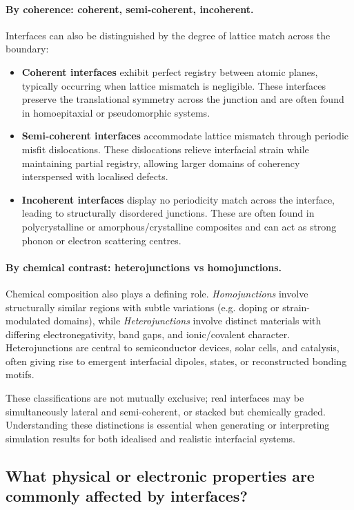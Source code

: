 \paragraph{By coherence: coherent, semi-coherent, incoherent.} Interfaces can also be distinguished by the degree of lattice match across the boundary:

\begin{itemize}
    \item \textbf{Coherent interfaces} exhibit perfect registry between atomic planes, typically occurring when lattice mismatch is negligible. These interfaces preserve the translational symmetry across the junction and are often found in homoepitaxial or pseudomorphic systems.
    \item \textbf{Semi-coherent interfaces} accommodate lattice mismatch through periodic misfit dislocations. These dislocations relieve interfacial strain while maintaining partial registry, allowing larger domains of coherency interspersed with localised defects.
    \item \textbf{Incoherent interfaces} display no periodicity match across the interface, leading to structurally disordered junctions. These are often found in polycrystalline or amorphous/crystalline composites and can act as strong phonon or electron scattering centres.
\end{itemize}

\paragraph{By chemical contrast: heterojunctions vs homojunctions.} Chemical composition also plays a defining role. \emph{Homojunctions} involve structurally similar regions with subtle variations (e.g. doping or strain-modulated domains), while \emph{Heterojunctions} involve distinct materials with differing electronegativity, band gaps, and ionic/covalent character. Heterojunctions are central to semiconductor devices, solar cells, and catalysis, often giving rise to emergent interfacial dipoles, states, or reconstructed bonding motifs.

These classifications are not mutually exclusive; real interfaces may be simultaneously lateral and semi-coherent, or stacked but chemically graded. Understanding these distinctions is essential when generating or interpreting simulation results for both idealised and realistic interfacial systems.

\subsection{What physical or electronic properties are commonly affected by interfaces?}

